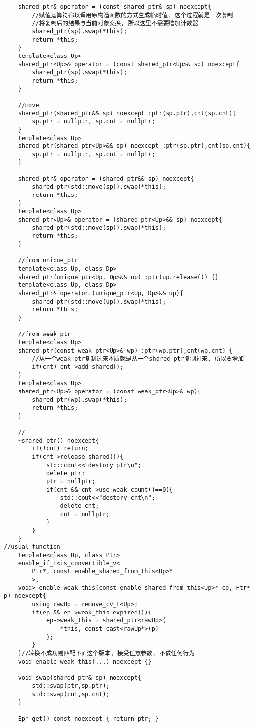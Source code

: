 \begin{lstlisting}
	shared_ptr& operator = (const shared_ptr& sp) noexcept{
		//赋值运算符都以调用原构造函数的方式生成临时值, 这个过程就是一次复制
		//将复制后的结果与当前对象交换, 所以这里不需要增加计数器
		shared_ptr(sp).swap(*this);
		return *this;
	}
	template<class Up>
	shared_ptr<Up>& operator = (const shared_ptr<Up>& sp) noexcept{
		shared_ptr(sp).swap(*this);
		return *this;
	}

	//move
	shared_ptr(shared_ptr&& sp) noexcept :ptr(sp.ptr),cnt(sp.cnt){
		sp.ptr = nullptr, sp.cnt = nullptr;
	}
	template<class Up>
	shared_ptr(shared_ptr<Up>&& sp) noexcept :ptr(sp.ptr),cnt(sp.cnt){
		sp.ptr = nullptr, sp.cnt = nullptr;
	}

	shared_ptr& operator = (shared_ptr&& sp) noexcept{
		shared_ptr(std::move(sp)).swap(*this);
		return *this;
	}
	template<class Up>
	shared_ptr<Up>& operator = (shared_ptr<Up>&& sp) noexcept{
		shared_ptr(std::move(sp)).swap(*this);
		return *this;
	}

	//from unique_ptr
	template<class Up, class Dp>
	shared_ptr(unique_ptr<Up, Dp>&& up) :ptr(up.release()) {}
	template<class Up, class Dp>
	shared_ptr& operator=(unique_ptr<Up, Dp>&& up){
		shared_ptr(std::move(up)).swap(*this);
		return *this;
	}

	//from weak_ptr
	template<class Up>
	shared_ptr(const weak_ptr<Up>& wp) :ptr(wp.ptr),cnt(wp.cnt) { 
		//从一个weak_ptr复制过来本质就是从一个shared_ptr复制过来, 所以要增加
		if(cnt) cnt->add_shared(); 
	}
	template<class Up>
	shared_ptr<Up>& operator = (const weak_ptr<Up>& wp){
		shared_ptr(wp).swap(*this);
		return *this;
	}

	//
	~shared_ptr() noexcept{
		if(!cnt) return;
		if(cnt->release_shared()){
			std::cout<<"destory ptr\n";
			delete ptr;
			ptr = nullptr;
			if(cnt && cnt->use_weak_count()==0){
				std::cout<<"destory cnt\n";
				delete cnt;
				cnt = nullptr;
			}
		}
	}
//usual function
	template<class Up, class Ptr> 
	enable_if_t<is_convertible_v<
		Ptr*, const enable_shared_from_this<Up>*
		>,
	void> enable_weak_this(const enable_shared_from_this<Up>* ep, Ptr* p) noexcept{
		using rawUp = remove_cv_t<Up>;
		if(ep && ep->weak_this.expired()){
			ep->weak_this = shared_ptr<rawUp>(
				*this, const_cast<rawUp*>(p)
			);
		} 
	}//转换不成功则匹配下面这个版本, 接受任意参数, 不做任何行为
	void enable_weak_this(...) noexcept {}

	void swap(shared_ptr& sp) noexcept{
		std::swap(ptr,sp.ptr);
		std::swap(cnt,sp.cnt);
	}

	Ep* get() const noexcept { return ptr; }


\end{lstlisting}
